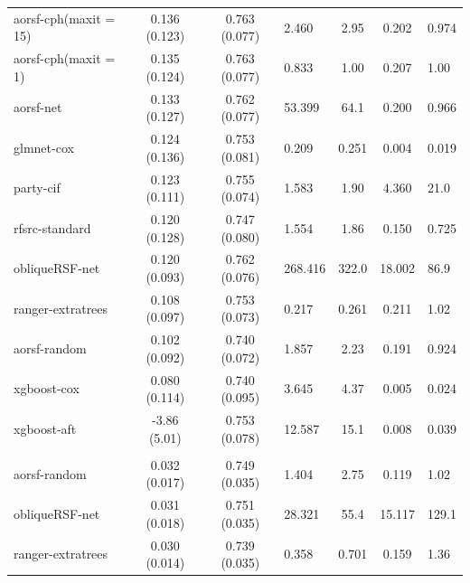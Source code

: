 \documentclass[twoside,11pt]{article}\usepackage[]{graphicx}\usepackage[]{color}
\newenvironment{knitrout}{}{} %
\begin{document}
\begin{knitrout}
\begin{longtable}{lcclccl}
\endfoot
\bottomrule
\endlastfoot
\addlinespace[0.3em]
\hline
\multicolumn{7}{l}{\textit{\textbf{Overall}}}\\
\hline
\hspace{1em}aorsf-cph(maxit = 15) & 0.136 (0.123) & 0.763 (0.077) & 2.460 & 2.95 & 0.202 & 0.974\\
\hspace{1em}aorsf-cph(maxit = 1) & 0.135 (0.124) & 0.763 (0.077) & 0.833 & 1.00 & 0.207 & 1.00\\
\hspace{1em}aorsf-net & 0.133 (0.127) & 0.762 (0.077) & 53.399 & 64.1 & 0.200 & 0.966\\
\hspace{1em}glmnet-cox & 0.124 (0.136) & 0.753 (0.081) & 0.209 & 0.251 & 0.004 & 0.019\\
\hspace{1em}party-cif & 0.123 (0.111) & 0.755 (0.074) & 1.583 & 1.90 & 4.360 & 21.0\\
\hspace{1em}rfsrc-standard & 0.120 (0.128) & 0.747 (0.080) & 1.554 & 1.86 & 0.150 & 0.725\\
\hspace{1em}obliqueRSF-net & 0.120 (0.093) & 0.762 (0.076) & 268.416 & 322.0 & 18.002 & 86.9\\
\hspace{1em}ranger-extratrees & 0.108 (0.097) & 0.753 (0.073) & 0.217 & 0.261 & 0.211 & 1.02\\
\hspace{1em}aorsf-random & 0.102 (0.092) & 0.740 (0.072) & 1.857 & 2.23 & 0.191 & 0.924\\
\hspace{1em}xgboost-cox & 0.080 (0.114) & 0.740 (0.095) & 3.645 & 4.37 & 0.005 & 0.024\\
\hspace{1em}xgboost-aft & -3.86 (5.01) & 0.753 (0.078) & 12.587 & 15.1 & 0.008 & 0.039\\
\addlinespace[0.3em]
\hline
\multicolumn{7}{l}{\textit{\textbf{ACTG 320; AIDS diagnosis, n = 1151, p = 12}}}\\
\hline
\hspace{1em}aorsf-random & 0.032 (0.017) & 0.749 (0.035) & 1.404 & 2.75 & 0.119 & 1.02\\
\hspace{1em}obliqueRSF-net & 0.031 (0.018) & 0.751 (0.035) & 28.321 & 55.4 & 15.117 & 129.1\\
\hspace{1em}ranger-extratrees & 0.030 (0.014) & 0.739 (0.035) & 0.358 & 0.701 & 0.159 & 1.36\\

\end{longtable}
\end{knitrout}
\end{document}
